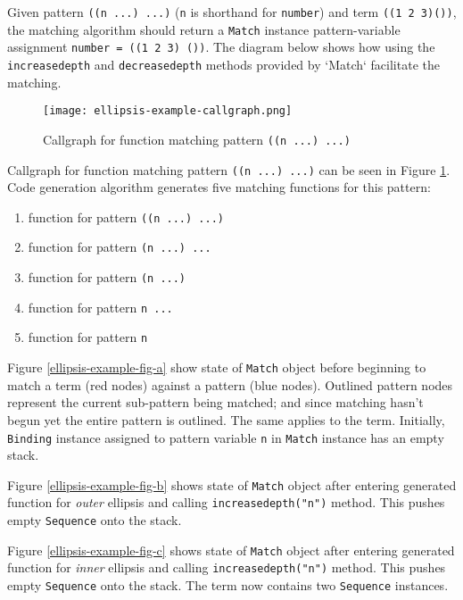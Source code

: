 
Given pattern \texttt{((n ...) ...)} (\texttt{n} is shorthand for \texttt{number}) and term \texttt{((1 2 3)())}, the matching algorithm should return a \texttt{Match} instance pattern-variable assignment \texttt{number = ((1 2 3) ())}. The diagram below shows how using the \texttt{increasedepth} and \texttt{decreasedepth} methods provided by `Match` facilitate the matching. 

\begin{figure}[h]
\texttt{[image: ellipsis-example-callgraph.png]}
\caption{Callgraph for function matching pattern \texttt{((n ...) ...)}}
\label{ellipsis-example-callgraph}
\end{figure}

Callgraph for function matching pattern \texttt{((n ...) ...)} can be seen in Figure \ref{ellipsis-example-callgraph}. Code generation algorithm generates five matching functions for this pattern:

\begin{enumerate}
\item function for pattern \texttt{((n ...) ...)}
\item function for pattern \texttt{(n ...) ...}
\item function for pattern \texttt{(n ...) }
\item function for pattern \texttt{n ... }
\item function for pattern \texttt{n}
\end{enumerate}

Figure \ref{ellipsis-example-fig-a} show state of \texttt{Match} object before beginning to match a term (red nodes) against a pattern (blue nodes). Outlined pattern nodes represent the current sub-pattern being matched; and since matching hasn't begun yet the entire pattern is outlined. The same applies to the term. Initially, \texttt{Binding} instance assigned to pattern variable \texttt{n} in \texttt{Match} instance has an empty stack.

Figure \ref{ellipsis-example-fig-b} shows state of \texttt{Match} object after entering generated function for \textit{outer} ellipsis and calling \texttt{increasedepth("n")} method. This pushes empty \texttt{Sequence} onto the stack.


Figure \ref{ellipsis-example-fig-c} shows state of \texttt{Match} object after entering generated function for \textit{inner} ellipsis and calling \texttt{increasedepth("n")} method. This pushes empty \texttt{Sequence} onto the stack. The term now contains two \texttt{Sequence} instances.

